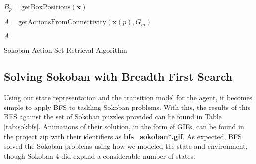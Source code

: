 \documentclass{article}[12pt]
\begin{document}
	\begin{algorithm}
		 \;
		 
		 $B_p = \text{getBoxPositions}\left(\boldsymbol{x}\right)$\;\;
		 
		 $A = \text{getActionsFromConnectivity}\left(\boldsymbol{x}(p), G_m\right)$ \;\;
		 
		 \;
		 
		 \Return $A$
		 
		 \caption{Sokoban Action Set Retrieval Algorithm}
		 \label{algo:aset}
	\end{algorithm}
	
	\newpage
	\subsection{Solving Sokoban with Breadth First Search}
	Using our state representation and the transition model for the agent, it becomes simple to apply BFS to tackling Sokoban problems. With this, the results of this BFS against the set of Sokoban puzzles provided can be found in Table \ref{tab:sokbfs}. Animations of their solution, in the form of GIFs, can be found in the project zip with their identifiers as \textbf{bfs\_sokoban*.gif}. As expected, BFS solved the Sokoban problems using how we modeled the state and environment, though Sokoban 4 did expand a considerable number of states.
	
\end{document}
